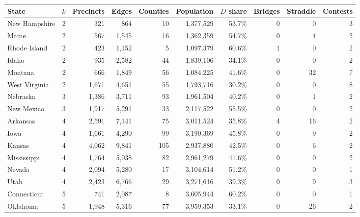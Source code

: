 \begin{tabular}{lrrrrrrrrr}
\toprule
State & $k$ & Precincts & Edges & Counties & Population & $D$ share & Bridges & Straddle & Contests \\
\midrule
New Hampshire & 2 & 321 & 864 & 10 & 1,377,529 & 53.7\% & 0 & 0 & 3 \\
Maine & 2 & 567 & 1,545 & 16 & 1,362,359 & 54.7\% & 0 & 4 & 2 \\
Rhode Island & 2 & 423 & 1,152 & 5 & 1,097,379 & 60.6\% & 1 & 0 & 2 \\
Idaho & 2 & 935 & 2,582 & 44 & 1,839,106 & 34.1\% & 0 & 0 & 2 \\
Montana & 2 & 666 & 1,849 & 56 & 1,084,225 & 41.6\% & 0 & 32 & 7 \\
West Virginia & 2 & 1,671 & 4,651 & 55 & 1,793,716 & 30.2\% & 0 & 0 & 8 \\
Nebraska & 3 & 1,386 & 3,711 & 93 & 1,961,504 & 40.2\% & 0 & 1 & 2 \\
New Mexico & 3 & 1,917 & 5,291 & 33 & 2,117,522 & 55.5\% & 0 & 0 & 2 \\
Arkansas & 4 & 2,591 & 7,141 & 75 & 3,011,524 & 35.8\% & 4 & 16 & 2 \\
Iowa & 4 & 1,661 & 4,290 & 99 & 3,190,369 & 45.8\% & 0 & 9 & 2 \\
Kansas & 4 & 4,062 & 9,841 & 105 & 2,937,880 & 42.5\% & 0 & 6 & 2 \\
Mississippi & 4 & 1,764 & 5,038 & 82 & 2,961,279 & 41.6\% & 0 & 0 & 2 \\
Nevada & 4 & 2,094 & 5,280 & 17 & 3,104,614 & 51.2\% & 0 & 0 & 1 \\
Utah & 4 & 2,423 & 6,766 & 29 & 3,271,616 & 39.3\% & 0 & 9 & 3 \\
Connecticut & 5 & 741 & 2,087 & 8 & 3,605,944 & 60.2\% & 0 & 0 & 1 \\
Oklahoma & 5 & 1,948 & 5,316 & 77 & 3,959,353 & 33.1\% & 0 & 26 & 2 \\
\bottomrule
\end{tabular}
